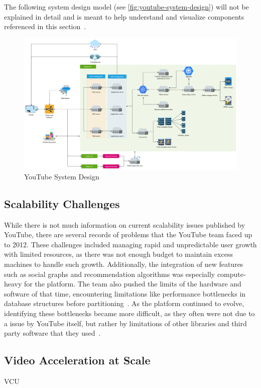 The following system design model (see \autoref{fig:youtube-system-design}) will not be explained in detail and is meant to help understand and visualize components referenced in this section~\parencite{youtube_architecture}.

\begin{figure}[htpb]
    \centering
    \includegraphics[width=\linewidth]{images/YoutubeSystemDesign.png}
    \caption[YouTube System Design]{YouTube System Design}\label{fig:youtube-system-design}
\end{figure}


\subsection{Scalability Challenges}


While there is not much information on current scalability issues published by YouTube, there are several records of problems that the YouTube team faced up to 2012. These challenges included managing rapid and unpredictable user growth with limited resources, as there was not enough budget to maintain excess machines to handle such growth. Additionally, the integration of new features such as social graphs and recommendation algorithms was especially compute-heavy for the platform. The team also pushed the limits of the hardware and software of that time, encountering limitations like performance bottlenecks in database structures before partitioning~\parencite{youtube_challenges}. As the platform continued to evolve, identifying these bottlenecks became more difficult, as they often were not due to a issue by YouTube itself, but rather by limitations of other libraries and third party software that they used~\parencite{youtube_challenges_2}.

\subsection{Video Acceleration at Scale}
\ac{VCU}
~\parencite{youtube_vpu} ~\parencite{youtube_infrastructure}
